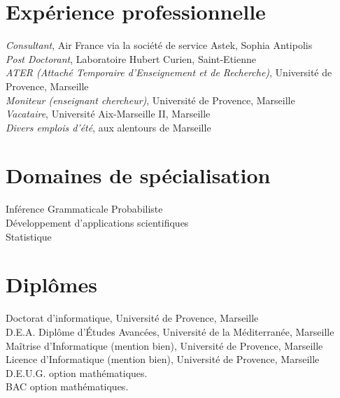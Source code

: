 


\reversemarginpar



\afficheContactInfos

\section*{Expérience professionnelle}

\noindent{}\emph{Consultant}, Air France via la société de service Astek, Sophia Antipolis\\
\emph{Post Doctorant}, Laboratoire Hubert Curien, Saint-Etienne\\
\emph{\textsc{ATER} (Attaché Temporaire d'Enseignement et de Recherche)}, Université de Provence, Marseille \\
\emph{Moniteur (enseignant \amper{} chercheur)}, Université de Provence, Marseille \\
\emph{Vacataire}, Université Aix-Marseille II, Marseille \\
\emph{Divers emplois d'été}, aux alentours de Marseille\\

\section*{Domaines de spécialisation}
Inférence Grammaticale Probabiliste\\
Développement d'applications scientifiques\\
Statistique

\section*{Diplômes}

\noindent{}Doctorat d'informatique, Université de Provence, Marseille\\
\noindent{}\textsc{D.E.A.} Diplôme d'Études Avancées, Université de la Méditerranée, Marseille\\
\noindent{}Maîtrise d'Informatique (mention bien), Université de Provence, Marseille\\
\noindent{}Licence d'Informatique (mention bien), Université de Provence, Marseille\\
\noindent{}\textsc{D.E.U.G.} option mathématiques.\\
\noindent{}\textsc{BAC} option mathématiques.

